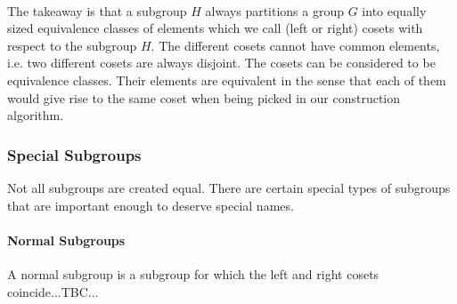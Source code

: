 
\paragraph{}
The takeaway is that a subgroup $H$ always partitions a group $G$ into equally sized equivalence classes of elements which we call (left or right) cosets with respect to the subgroup $H$. The different cosets cannot have common elements, i.e. two different cosets are always disjoint. The cosets can be considered to be equivalence classes. Their elements are equivalent in the sense that each of them would give rise to the same coset when being picked in our construction algorithm.




\subsubsection{Special Subgroups}
Not all subgroups are created equal. There are certain special types of subgroups that are important enough to deserve special names.

\paragraph{Normal Subgroups} A normal subgroup is a subgroup for which the left and right cosets coincide...TBC...



